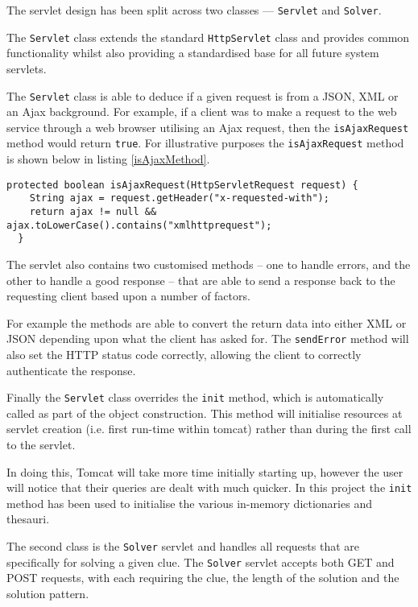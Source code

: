 The servlet design has been split across two classes --- \texttt{Servlet} and 
\texttt{Solver}.

The \texttt{Servlet} class extends the standard \texttt{HttpServlet} class and
provides common functionality whilst also providing a standardised base for all 
future system servlets.

The \texttt{Servlet} class is able to deduce if a given request is from a JSON,
XML or an Ajax background. For example, if a client was to make a request to the
web  service through a web browser utilising an Ajax request, then the 
\texttt{isAjaxRequest} method would return \texttt{true}. For illustrative 
purposes the \texttt{isAjaxRequest} method is shown below in listing 
\ref{isAjaxMethod}.

\begin{lstlisting}[caption={isAjaxMethod deduces if a request was made by AJAX},
                   label=isAjaxMethod]  
  protected boolean isAjaxRequest(HttpServletRequest request) {
    String ajax = request.getHeader("x-requested-with");
    return ajax != null && ajax.toLowerCase().contains("xmlhttprequest");
  }
\end{lstlisting}

The servlet also contains two customised methods -- one to handle errors, and 
the other to handle a good response -- that are able to send a response back to 
the requesting client based upon a number of factors.

For example the methods are able to convert the return data into either XML or 
JSON depending upon what the client has asked for. The \texttt{sendError} method
will also set the HTTP status code correctly, allowing the client to correctly 
authenticate the response.

Finally the \texttt{Servlet} class overrides the \texttt{init} method, which 
is automatically called as part of the object construction. This method will 
initialise resources at servlet creation (i.e. first run-time within tomcat) 
rather than during the first call to the servlet. 

In doing this, Tomcat will take more time initially starting up, however the 
user will notice that their queries are dealt with much quicker. In this project
the \texttt{init} method has been used to initialise the various in-memory 
dictionaries and thesauri.

The second class is the \texttt{Solver} servlet and handles all requests that are
specifically for solving a given clue. The \texttt{Solver} servlet accepts both
GET and POST requests, with each requiring the clue, the length of the solution
and the solution pattern.

